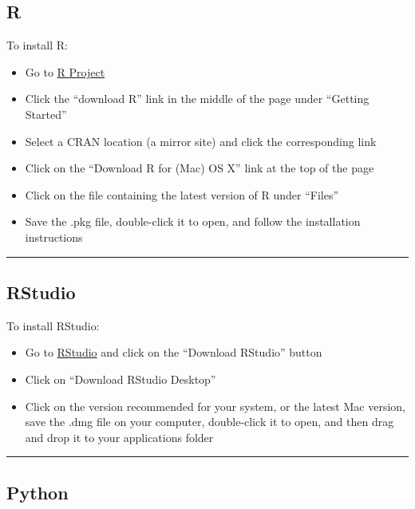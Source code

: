 \documentclass[]{book}
\providecommand{\tightlist}{%
  \setlength{\itemsep}{0pt}\setlength{\parskip}{0pt}}
\begin{document}
\hypertarget{r}{%
\subsection{R}\label{r}}

To install R:

\begin{itemize}
\tightlist
\item
  Go to \href{http://www.r-project.org}{R Project}
\item
  Click the ``download R'' link in the middle of the page under ``Getting Started''
\item
  Select a CRAN location (a mirror site) and click the corresponding link
\item
  Click on the ``Download R for (Mac) OS X'' link at the top of the page
\item
  Click on the file containing the latest version of R under ``Files''
\item
  Save the .pkg file, double-click it to open, and follow the installation instructions
\end{itemize}

\begin{center}\rule{0.5\linewidth}{0.5pt}\end{center}

\hypertarget{rstudio}{%
\subsection{RStudio}\label{rstudio}}

To install RStudio:

\begin{itemize}
\tightlist
\item
  Go to \href{http://www.rstudio.com}{RStudio} and click on the ``Download RStudio'' button
\item
  Click on ``Download RStudio Desktop''
\item
  Click on the version recommended for your system, or the latest Mac version, save the .dmg file on your computer, double-click it to open, and then drag and drop it to your applications folder
\end{itemize}

\begin{center}\rule{0.5\linewidth}{0.5pt}\end{center}

\hypertarget{python}{%
\subsection{Python}\label{python}}
\end{document}
